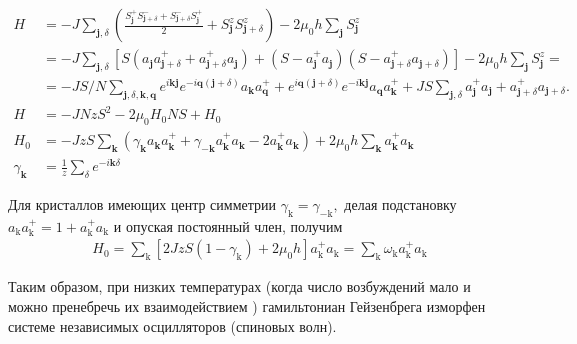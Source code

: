 \documentclass[a4paper,12pt]{article} %
\begin{document}
\begin{ttask}
$$\begin{aligned} 
	H &=
	-J \sum_{\mathbf{j}, \delta}
	\left(
	\frac{S_{\mathbf{j}}^{+} S_{\mathbf{j}+\delta}^{-}+S_{\mathbf{j}+\delta}^{-} S_{\mathbf{j}}^{+}}{2}
	+
	S_{\mathbf{j}}^{z} S_{\mathbf{j}+\delta}^{z}
	\right)
	-
	2 \mu_{0} h \sum_{\mathbf{j}} S_{\mathbf{j}}^{z} 
	\\ 
	&=-J \sum_{\mathbf{j}, \delta}\left[S\left(a_{\mathbf{j}} a_{\mathbf{j}+\delta}^{+}+a_{\mathbf{j}+\delta}^{+} a_{\mathbf{j}}\right)+\left(S-a_{\mathbf{j}}^{+} a_{\mathbf{j}}\right)\left(S-a_{\mathbf{j}+\delta}^{+} a_{\mathbf{j}+\delta}\right)\right]-2 \mu_{0} h \sum_{\mathbf{j}} S_{\mathbf{j}}^{z}=\\ &=-J S / N \sum_{\mathbf{j}, \delta, \mathbf{k}, \mathbf{q}} e^{i \mathbf{k} \mathbf{j}} e^{-i \mathbf{q}(\mathbf{j}+\delta)} a_{\mathbf{k}} a_{\mathbf{q}}^{+}+e^{i \mathbf{q}(\mathbf{j}+\delta)} e^{-i \mathbf{k} \mathbf{j}} a_{\mathbf{q}} a_{\mathbf{k}}^{+}+J S \sum_{\mathbf{j}, \delta} a_{\mathbf{j}}^{+} a_{\mathbf{j}}+a_{\mathbf{j}+\delta}^{+} a_{\mathbf{j}+\delta} . \\ H &=-J N z S^{2}-2 \mu_{0} H_{0} N S+H_{0} \\ H_{0} &=-J z S \sum_{\mathbf{k}}\left(\gamma_{\mathbf{k}} a_{\mathbf{k}} a_{\mathbf{k}}^{+}+\gamma_{-\mathbf{k}} a_{\mathbf{k}}^{+} a_{\mathbf{k}}-2 a_{\mathbf{k}}^{+} a_{\mathbf{k}}\right)+2 \mu_{0} h \sum_{\mathbf{k}} a_{\mathbf{k}}^{+} a_{\mathbf{k}} \\ \gamma_{\mathbf{k}} &=\frac{1}{z} \sum_{\delta} e^{-i \mathbf{k} \delta}
\end{aligned}$$




Для кристаллов имеющих центр симметрии $\gamma_{\mathrm{k}}=\gamma_{-\mathrm{k}},$ 
делая подстановку $a_{\mathrm{k}} a_{\mathrm{k}}^{+}=1+a_{\mathrm{k}}^{+} a_{\mathrm{k}}$ 
и опуская постоянный член, получим
$$
\begin{aligned}
	H_{0} 
	=
	\sum_{\mathrm{k}}\left[
	2 J z S\left(1-\gamma_{\mathrm{k}}\right)+2 \mu_{0} h
	\right] a_{\mathrm{k}}^{+} a_{\mathrm{k}}
	=
	\sum_{\mathrm{k}} 
	\omega_{\mathrm{k}} a_{\mathrm{k}}^{+} a_{\mathrm{k}}
\end{aligned}
$$



Таким образом, при низких температурах (когда число возбуждений мало и можно пренебречь их взаимодействием ) 
гамильтониан Гейзенбрега изморфен системе независимых осцилляторов (спиновых волн). 




\end{ttask}
\end{document}
